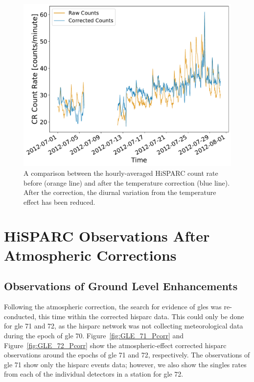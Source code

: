 \begin{figure}[ht!]
	\centering
	\includegraphics[width=0.65\columnwidth]{8001_raw_vs_corrected.pdf}
	\caption{A comparison between the hourly-averaged HiSPARC count rate before (orange line) and after the temperature correction (blue line). After the correction, the diurnal variation from the temperature effect has been reduced.}
 	\label{fig:HS_T_corr}
\end{figure}
 

 

\section{HiSPARC Observations After Atmospheric Corrections}\label{sec:HS_obs_Pcorr}


\subsection{Observations of Ground Level Enhancements}

Following the atmospheric correction, the search for evidence of \glspl{gle} was re-conducted, this time within the corrected \gls{hisparc} data. This could only be done for \gls{gle} 71 and 72, as the \gls{hisparc} network was not collecting meteorological data during the epoch of \gls{gle} 70. Figure~\ref{fig:GLE_71_Pcorr} and Figure~\ref{fig:GLE_72_Pcorr} show the atmospheric-effect corrected \gls{hisparc} observations around the epochs of \gls{gle} 71 and 72, respectively. The observations of \gls{gle} 71 show only the \gls{hisparc} events data; however, we also show the singles rates from each of the individual detectors in a station for \gls{gle} 72.

